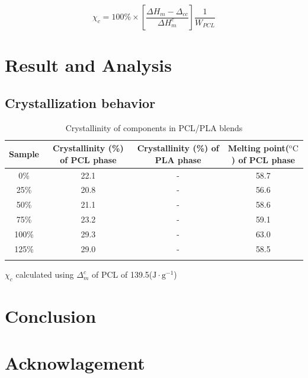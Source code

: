 \documentclass{article}%
\begin{document}
    \begin{equation}
      \chi_{c}=100\%\times[{}\frac{\Delta H_m -\Delta_{cc}}{\Delta H^c_m }]\frac{1}{W_{PCL}}
      \label{eq1}
    \end{equation}
  
  
  
   
  \label{sec:experiment}
  \section{Result and Analysis} %
    \subsection{Crystallization behavior}
    \label{sec:result_and_Analysis}
    \renewcommand{\tablename}{\textbf{Table}}
    \captionsetup[table]{labelsep = period}
    \begin{table} %
      \caption{Crystallinity of components in PCL/PLA blends}
      \begin{tabular}{cccc}
      \toprule
      Sample & Crystallinity (\%) of PCL phase & Crystallinity (\%) of PLA phase & Melting point($\mathrm{^o C}$) of PCL phase\\
      \midrule
      0\% & 22.1 & - & 58.7\\
      25\% & 20.8 & - & 56.6\\
      50\% & 21.1 & - & 58.6\\
      75\% & 23.2 & - & 59.1\\
      100\% & 29.3 & - & 63.0 \\
      125\% & 29.0 & - & 58.5 \\
      \bottomrule
      \label{DSC_result_table}
      \end{tabular}
      $\chi_c $ calculated using $\Delta_m^c$ of PCL of 139.5($\mathrm{J\cdot g^{-1}}$)
    \end{table}
  \section{Conclusion} %
  \label{sec:conclusion}
  
  \section{Acknowlagement} %
  \label{sec:acknowledgement}
  
  
  
\end{document}

